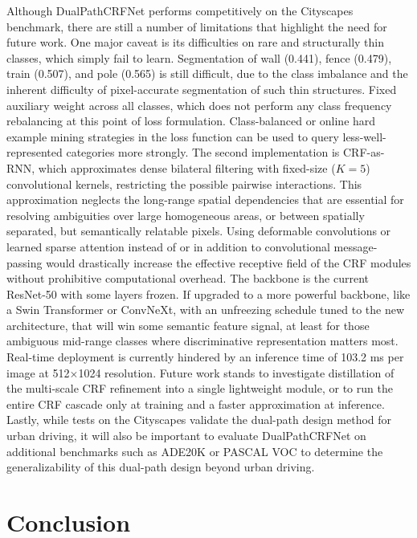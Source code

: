 \documentclass[conference]{IEEEtran}
\begin{document}
Although DualPathCRFNet performs competitively on the Cityscapes benchmark, there are still a number
of limitations that highlight the need for future work. One major caveat is its difficulties on rare and
structurally thin classes, which simply fail to learn. Segmentation of wall (0.441), fence (0.479), train
(0.507), and pole (0.565) is still difficult, due to the class imbalance and the inherent difficulty of pixel-accurate segmentation of such thin structures. Fixed auxiliary weight across all classes, which does not
perform any class frequency rebalancing at this point of loss formulation. Class-balanced or online hard
example mining strategies in the loss function can be used to query less-well-represented categories more
strongly. The second implementation is CRF-as-RNN, which approximates dense bilateral filtering with
fixed-size ($K = 5$) convolutional kernels, restricting the possible pairwise interactions. This approximation
neglects the long-range spatial dependencies that are essential for resolving ambiguities over large
homogeneous areas, or between spatially separated, but semantically relatable pixels. Using deformable
convolutions or learned sparse attention instead of or in addition to convolutional message-passing would
drastically increase the effective receptive field of the CRF modules without prohibitive computational
overhead. The backbone is the current ResNet-50 with some layers frozen. If upgraded to a more powerful
backbone, like a Swin Transformer or ConvNeXt, with an unfreezing schedule tuned to the new
architecture, that will win some semantic feature signal, at least for those ambiguous mid-range classes
where discriminative representation matters most. Real-time deployment is currently hindered by an
inference time of 103.2 ms per image at 512$\times$1024 resolution. Future work stands to investigate
distillation of the multi-scale CRF refinement into a single lightweight module, or to run the entire CRF
cascade only at training and a faster approximation at inference. Lastly, while tests on the Cityscapes
validate the dual-path design method for urban driving, it will also be important to evaluate
DualPathCRFNet on additional benchmarks such as ADE20K or PASCAL VOC to determine the
generalizability of this dual-path design beyond urban driving.

 
\section{Conclusion}\label{sec:conclusion}
\end{document}
